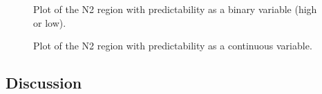 \documentclass[
  12pt,
  letterpaper,
]{scrreprt}
\begin{document}
\begin{figure}[htbp]

\caption{\label{fig-N2Predictability}Plot of the N2 region with
predictability as a binary variable (high or low).}


\end{figure}%

\begin{figure}[htbp]

\caption{\label{fig-N2LogOdds}Plot of the N2 region with predictability
as a continuous variable.}


\end{figure}%

\subsection{Discussion}\label{discussion-1}
\end{document}

